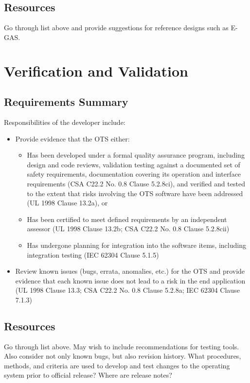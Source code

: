 \documentclass[12pt]{../Common_files/ElisaPaper}
\begin{document}
\subsection{Resources}
Go through list above and provide suggestions for reference designs such as E-GAS.

\section{Verification and Validation}

\subsection{Requirements Summary}
Responsibilities of the developer include:

\begin{itemize}

\item Provide evidence that the OTS either:

\begin{itemize}

\item Has been developed under a formal quality assurance program, including design and code reviews, validation testing against a documented set of safety requirements, documentation covering its operation and interface requirements (CSA C22.2 No. 0.8 \cite{CSA0.8} Clause 5.2.8ci), and verified and tested to the extent that risks involving the OTS software have been addressed (UL 1998 \cite{UL1998} Clause 13.2a), or

\item Has been certified to meet defined requirements by an independent assessor (UL 1998 \cite{UL1998} Clause 13.2b; CSA C22.2 No. 0.8 \cite{CSA0.8} Clause 5.2.8cii)

\item Has undergone planning for integration into the software items, including integration testing (IEC 62304 \cite{IEC62304} Clause 5.1.5)

\end{itemize}

\item Review known issues (bugs, errata, anomalies, etc.) for the OTS and provide evidence that each known issue does not lead to a risk in the end application (UL 1998 \cite{UL1998} Clause 13.3; CSA C22.2 No. 0.8 \cite{CSA0.8} Clause 5.2.8a; IEC 62304 \cite{IEC62304} Clause 7.1.3)

\end{itemize}

\subsection{Resources}
Go through list above.  May wish to include recommendations for testing tools.  Also consider not only known bugs, but also revision history.  What procedures, methods, and criteria are used to develop and test changes to the operating system prior to official release?  Where are release notes?

\newpage

{}

	
\end{document}
